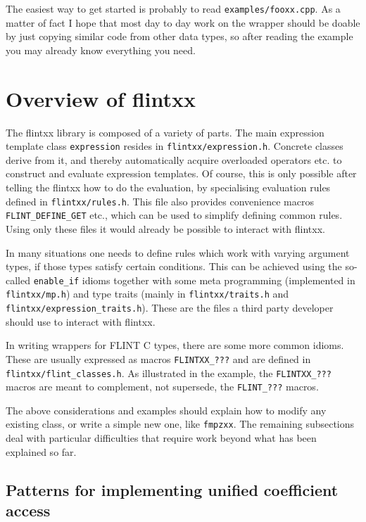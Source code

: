 \documentclass[a4paper,10pt]{book}
\newcommand{\code}{\lstinline}
\begin{document}
{{The easiest way to get started is probably to read \code{examples/fooxx.cpp}.
As a matter of fact I hope that most day to day work on the wrapper should be
doable by just copying similar code from other data types, so after reading the
example you may already know everything you need.

\section{Overview of flintxx}

The flintxx library is composed of a variety of parts. The main expression
template class \code{expression} resides in \code{flintxx/expression.h}.
Concrete classes derive from it, and thereby automatically acquire overloaded
operators etc. to construct and evaluate expression templates. Of course, this
is only possible after telling the flintxx how to do the evaluation, by
specialising evaluation rules defined in \code{flintxx/rules.h}. This file also
provides convenience macros \code{FLINT_DEFINE_GET} etc., which can be used to
simplify defining common rules. Using only these files it would already be
possible to interact with flintxx.

In many situations one needs to define rules which work with varying argument
types, if those types satisfy certain conditions. This can be achieved using the
so-called \code{enable_if} idioms together with some meta programming
(implemented in \code{flintxx/mp.h}) and type traits (mainly in
\code{flintxx/traits.h} and \code{flintxx/expression_traits.h}). These are the
files a third party developer should use to interact with flintxx.

In writing wrappers for FLINT C types, there are some more common idioms. These
are usually expressed as macros \code{FLINTXX_???} and are defined in
\code{flintxx/flint_classes.h}. As illustrated in the example, the
\code{FLINTXX_???} macros are meant to complement, not supersede, the
\code{FLINT_???} macros.

The above considerations and examples should explain how to modify any existing
class, or write a simple new one, like \code{fmpzxx}. The remaining subsections
deal with particular difficulties that require work beyond what has been
explained so far.

\subsection{Patterns for implementing unified coefficient access}

}}
\end{document}
